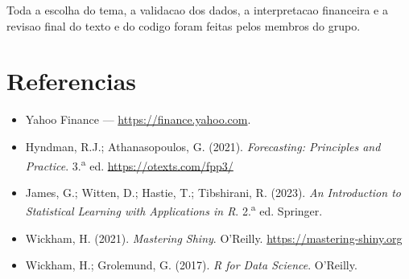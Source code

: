 \documentclass[11pt,a4paper]{article}
\begin{document}
Toda a escolha do tema, a validacao dos dados, a interpretacao
financeira e a revisao final do texto e do codigo foram feitas pelos
membros do grupo.

\section*{Referencias}
\begin{itemize}[leftmargin=*]
  \item Yahoo Finance --- \url{https://finance.yahoo.com}.
  \item Hyndman, R.J.; Athanasopoulos, G. (2021).
        \emph{Forecasting: Principles and Practice}. 3.\textsuperscript{a} ed.
        \url{https://otexts.com/fpp3/}
  \item James, G.; Witten, D.; Hastie, T.; Tibshirani, R. (2023).
        \emph{An Introduction to Statistical Learning with
        Applications in R}. 2.\textsuperscript{a} ed. Springer.
  \item Wickham, H. (2021). \emph{Mastering Shiny}. O'Reilly.
        \url{https://mastering-shiny.org}
  \item Wickham, H.; Grolemund, G. (2017). \emph{R for Data Science}.
        O'Reilly.
\end{itemize}
\end{document}
